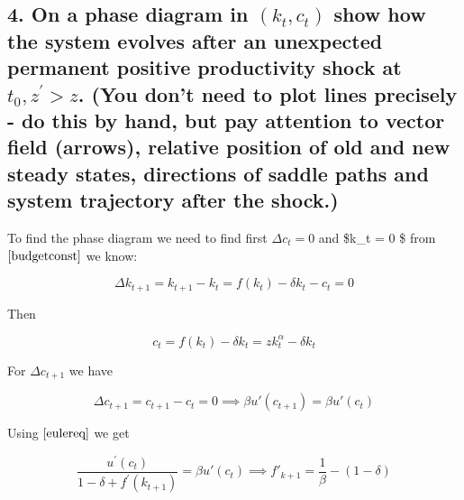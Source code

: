 \documentclass[10pt,notitlepage,onecolumn,aps,pra]{revtex4-1}
\begin{document}
    \hypertarget{on-a-phase-diagram-in-leftk_t-c_tright-show-how-the-system-evolves-after-an-unexpected-permanent-positive-productivity-shock-at-t_0-zprimez.-you-dont-need-to-plot-lines-precisely---do-this-by-hand-but-pay-attention-to-vector-field-arrows-relative-position-of-old-and-new-steady-states-directions-of-saddle-paths-and-system-trajectory-after-the-shock.}{%
\subsection{\texorpdfstring{4. On a phase diagram in
\(\left(k_{t}, c_{t}\right)\) show how the system evolves after an
unexpected permanent positive productivity shock at
\(t_{0}, z^{\prime}>z\). (You don't need to plot lines precisely - do
this by hand, but pay attention to vector field (arrows), relative
position of old and new steady states, directions of saddle paths and
system trajectory after the
shock.)}{4. On a phase diagram in \textbackslash left(k\_\{t\}, c\_\{t\}\textbackslash right) show how the system evolves after an unexpected permanent positive productivity shock at t\_\{0\}, z\^{}\{\textbackslash prime\}\textgreater z. (You don't need to plot lines precisely - do this by hand, but pay attention to vector field (arrows), relative position of old and new steady states, directions of saddle paths and system trajectory after the shock.)}}\label{on-a-phase-diagram-in-leftk_t-c_tright-show-how-the-system-evolves-after-an-unexpected-permanent-positive-productivity-shock-at-t_0-zprimez.-you-dont-need-to-plot-lines-precisely---do-this-by-hand-but-pay-attention-to-vector-field-arrows-relative-position-of-old-and-new-steady-states-directions-of-saddle-paths-and-system-trajectory-after-the-shock.}}

To find the phase diagram we need to find first \(\Delta c_t = 0\) and
\$\Delta k\_t = 0 \$ from \(\eqref{budgetconst}\) we know:

\[\Delta k_{t+1} = k_{t+1} - k_{t} = f(k_t) - \delta k_t - c_t = 0\]

Then

\[c_t = f(k_t) - \delta k_t = z k_t^\alpha - \delta k_t\]

For \(\Delta c_{t+1}\) we have

\[\Delta c_{t+1} = c_{t+1} - c_t = 0 \implies \beta u'(c_{t+1}) = \beta u'(c_{t})\]

Using \(\eqref{eulereq}\) we get

\[\frac{u^{\prime}\left(c_{t}\right)}{1-\delta+f^{\prime}\left(k_{t+1}\right)} = \beta u'(c_{t})\implies f'_{k+1} = \frac{1}{\beta} - (1-\delta)\]
\end{document}
